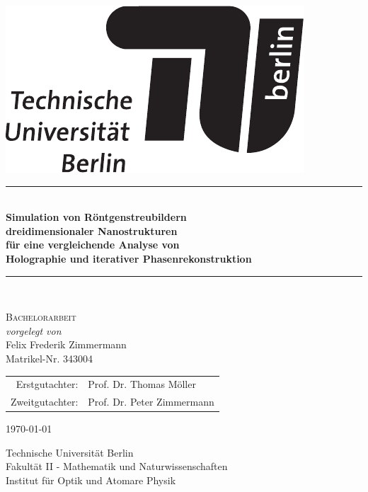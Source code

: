 \begin{titlepage}
		
	\begin{center}
				
				
		\begin{flushright}
			\includegraphics[width=.3\textwidth]{images/TU_Logo.pdf}\\[2.5cm]    
			\end{flushright}
					
					
			{\newcommand{\HRule}{\rule{\linewidth}{0.5mm}}
				\HRule \\[0.4cm]
				\LARGE{\bfseries Simulation von Röntgenstreubildern\\ dreidimensionaler Nanostrukturen\\ für eine vergleichende Analyse von\\ Holographie und iterativer Phasenrekonstruktion}\\
							
				\HRule \\[1.5cm]}
			\textsc{\Large Bachelorarbeit}\\[0.5cm]
					
			\emph{vorgelegt von}\\
			Felix Frederik Zimmermann\\
			Matrikel-Nr. 343004\\[0.5cm]
			
			\begin{table}[h]
				\centering
				\begin{tabular}{rl}
					Erstgutachter:& Prof. Dr. Thomas Möller\\
					Zweitgutachter:& Prof. Dr. Peter Zimmermann\\
				\end{tabular}
			\end{table}		
			{\large \today}
			
			\vfill
					
			Technische Universität Berlin\\
			Fakultät II - Mathematik und Naturwissenschaften\\
			Institut für Optik und Atomare Physik\\					
		\end{center}
			
	\end{titlepage}
